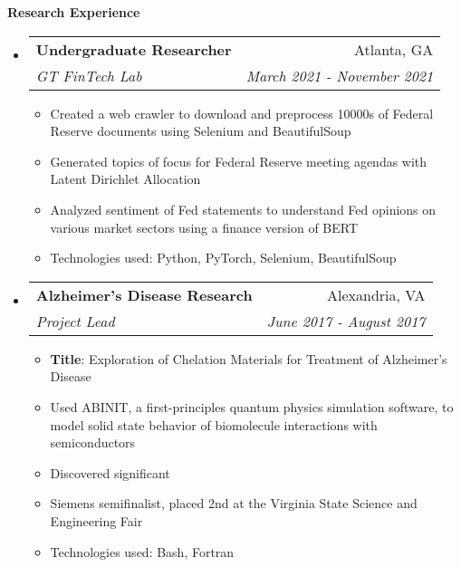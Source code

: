 \documentclass[letterpaper,10pt]{article}
\makeatletter
\newcommand{\resitem}[1]{\item #1 \vspace{-3.5pt}}  %
\newcommand{\resheading}[1]{{\large \colorbox{mygrey}{\begin{minipage}{0.989\textwidth}{\textbf{#1 \vphantom{p\^{E}}}}\end{minipage}}}}
\newcommand{\ressubheading}[4]{
\begin{tabular*}{7.0in}{l@{\extracolsep{\fill}}r}  
		\textbf{#1} & #2 \\
		\textit{#3} & \textit{#4} \\
\end{tabular*}\vspace{-6pt}}  %
\makeatother
\begin{document}


\resheading{Research Experience}
\begin{itemize}
\item
    \ressubheading{Undergraduate Researcher}{Atlanta, GA}{GT FinTech Lab}{March 2021 - November 2021}
    \begin{itemize}
        \resitem{Created a web crawler to download and preprocess 10000s of Federal Reserve documents using Selenium and BeautifulSoup}
        \resitem{Generated topics of focus for Federal Reserve meeting agendas with Latent Dirichlet Allocation}
        \resitem{Analyzed sentiment of Fed statements to understand Fed opinions on various market sectors using a finance version of BERT}
        \resitem{Technologies used: Python, PyTorch, Selenium, BeautifulSoup}
    \end{itemize}
\item
    \ressubheading{Alzheimer's Disease Research}{Alexandria, VA}{Project Lead}{June 2017 - August 2017}
    \begin{itemize}
        \resitem{\textbf{Title}: Exploration of Chelation Materials for Treatment of Alzheimer's Disease}
        \resitem{Used ABINIT, a first-principles quantum physics simulation software, to model solid state behavior of biomolecule interactions with semiconductors}
        \resitem{Discovered significant }
        \resitem{Siemens semifinalist, placed 2nd at the Virginia State Science and Engineering Fair}
        \resitem{Technologies used: Bash, Fortran}
    \end{itemize}
\end{itemize}
\end{document}
